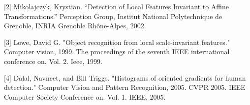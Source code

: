 \documentclass{article}
\begin{document}
[2] Mikolajczyk, Krystian. “Detection of Local Features Invariant to Affine Transformations.” Perception Group, Institut National Polytechnique de Grenoble, INRIA Grenoble Rhône-Alpes, 2002.

[3] Lowe, David G. "Object recognition from local scale-invariant features." Computer vision, 1999. The proceedings of the seventh IEEE international conference on. Vol. 2. Ieee, 1999.

[4] Dalal, Navneet, and Bill Triggs. "Histograms of oriented gradients for human detection." Computer Vision and Pattern Recognition, 2005. CVPR 2005. IEEE Computer Society Conference on. Vol. 1. IEEE, 2005.

% 
% 
\end{document}
